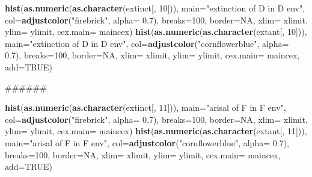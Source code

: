 \documentclass[]{book}
\newenvironment{Shaded}{\begin{snugshade}}{\end{snugshade}}
\newcommand{\KeywordTok}[1]{\textcolor[rgb]{0.13,0.29,0.53}{\textbf{{#1}}}}
\newcommand{\DataTypeTok}[1]{\textcolor[rgb]{0.13,0.29,0.53}{{#1}}}
\newcommand{\DecValTok}[1]{\textcolor[rgb]{0.00,0.00,0.81}{{#1}}}
\newcommand{\FloatTok}[1]{\textcolor[rgb]{0.00,0.00,0.81}{{#1}}}
\newcommand{\StringTok}[1]{\textcolor[rgb]{0.31,0.60,0.02}{{#1}}}
\newcommand{\OtherTok}[1]{\textcolor[rgb]{0.56,0.35,0.01}{{#1}}}
\newcommand{\NormalTok}[1]{{#1}}
\theoremstyle{definition}
\theoremstyle{definition}
\theoremstyle{definition}
\theoremstyle{remark}
\begin{document}
\begin{Shaded}
\begin{Highlighting}[]
\KeywordTok{hist}\NormalTok{(}\KeywordTok{as.numeric}\NormalTok{(}\KeywordTok{as.character}\NormalTok{(extinct[, }\DecValTok{10}\NormalTok{])), }\DataTypeTok{main=}\StringTok{"extinction of D in D env"}\NormalTok{, }\DataTypeTok{col=}\KeywordTok{adjustcolor}\NormalTok{(}\StringTok{"firebrick"}\NormalTok{, }\DataTypeTok{alpha=} \FloatTok{0.7}\NormalTok{), }\DataTypeTok{breaks=}\DecValTok{100}\NormalTok{, }\DataTypeTok{border=}\OtherTok{NA}\NormalTok{, }\DataTypeTok{xlim=}\NormalTok{ xlimit, }\DataTypeTok{ylim=}\NormalTok{ ylimit, }\DataTypeTok{cex.main=}\NormalTok{ maincex)}
\KeywordTok{hist}\NormalTok{(}\KeywordTok{as.numeric}\NormalTok{(}\KeywordTok{as.character}\NormalTok{(extant[, }\DecValTok{10}\NormalTok{])), }\DataTypeTok{main=}\StringTok{"extinction of D in D env"}\NormalTok{, }\DataTypeTok{col=}\KeywordTok{adjustcolor}\NormalTok{(}\StringTok{"cornflowerblue"}\NormalTok{, }\DataTypeTok{alpha=} \FloatTok{0.7}\NormalTok{), }\DataTypeTok{breaks=}\DecValTok{100}\NormalTok{, }\DataTypeTok{border=}\OtherTok{NA}\NormalTok{, }\DataTypeTok{xlim=}\NormalTok{ xlimit, }\DataTypeTok{ylim=}\NormalTok{ ylimit, }\DataTypeTok{cex.main=}\NormalTok{ maincex, }\DataTypeTok{add=}\OtherTok{TRUE}\NormalTok{)}

\NormalTok{######}

\KeywordTok{hist}\NormalTok{(}\KeywordTok{as.numeric}\NormalTok{(}\KeywordTok{as.character}\NormalTok{(extinct[, }\DecValTok{11}\NormalTok{])), }\DataTypeTok{main=}\StringTok{"arisal of F in F env"}\NormalTok{, }\DataTypeTok{col=}\KeywordTok{adjustcolor}\NormalTok{(}\StringTok{"firebrick"}\NormalTok{, }\DataTypeTok{alpha=} \FloatTok{0.7}\NormalTok{), }\DataTypeTok{breaks=}\DecValTok{100}\NormalTok{, }\DataTypeTok{border=}\OtherTok{NA}\NormalTok{, }\DataTypeTok{xlim=}\NormalTok{ xlimit, }\DataTypeTok{ylim=}\NormalTok{ ylimit, }\DataTypeTok{cex.main=}\NormalTok{ maincex)}
\KeywordTok{hist}\NormalTok{(}\KeywordTok{as.numeric}\NormalTok{(}\KeywordTok{as.character}\NormalTok{(extant[, }\DecValTok{11}\NormalTok{])), }\DataTypeTok{main=}\StringTok{"arisal of F in F env"}\NormalTok{, }\DataTypeTok{col=}\KeywordTok{adjustcolor}\NormalTok{(}\StringTok{"cornflowerblue"}\NormalTok{, }\DataTypeTok{alpha=} \FloatTok{0.7}\NormalTok{), }\DataTypeTok{breaks=}\DecValTok{100}\NormalTok{, }\DataTypeTok{border=}\OtherTok{NA}\NormalTok{, }\DataTypeTok{xlim=}\NormalTok{ xlimit, }\DataTypeTok{ylim=}\NormalTok{ ylimit, }\DataTypeTok{cex.main=}\NormalTok{ maincex, }\DataTypeTok{add=}\OtherTok{TRUE}\NormalTok{)}




\end{Highlighting}
\end{Shaded}
\end{document}
